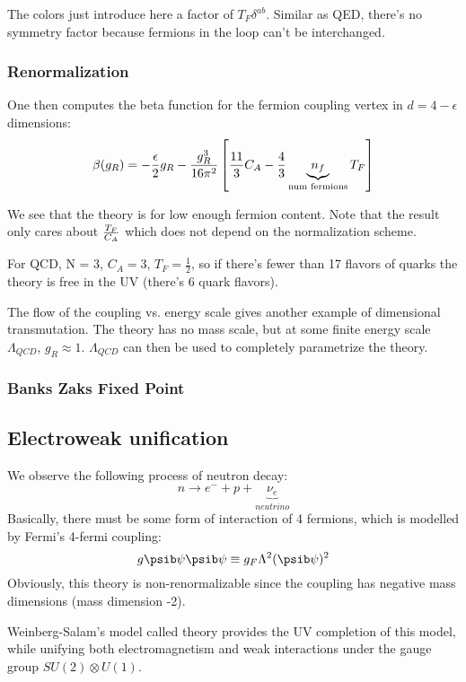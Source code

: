 \documentclass[11pt]{scrartcl}
\begin{document}
The colors just introduce here a factor of $T_F \delta^{ab}$.  Similar as QED, there's no symmetry factor because fermions in the loop can't be interchanged.

\subsubsection{Renormalization}

One then computes the beta function for the fermion coupling vertex in $d = 4 - \epsilon$ dimensions:
\[\beta(g_R) = - {\epsilon \over 2} g_R - {g_R^3 \over 16 \pi^2} \left[ {11 \over 3} C_A - {4 \over 3} \underbrace{n_f}_{ \text{num fermions}} T_F \right] \]

We see that the theory is  for low enough fermion content.  Note that the result only cares about ${T_F \over C_A}$ which does not depend on the normalization scheme.

For QCD, N = 3, $C_A = 3$, $T_F = \frac12$, so if there's fewer than 17 flavors of quarks the theory is free in the UV (there's 6 quark flavors).

The flow of the coupling vs. energy scale gives another example of dimensional transmutation.  The theory has no mass scale, but at some finite energy scale $\Lambda_{QCD}$, $g_R \approx 1$.  $\Lambda_{QCD}$ can then be used to completely parametrize the theory.

\subsubsection{Banks Zaks Fixed Point}

\subsection{Electroweak unification}
We observe the following process of neutron decay:
\[n \rightarrow e^- + p + \underbrace{\nu_e}_{neutrino} \]
Basically, there must be some form of interaction of 4 fermions, which is modelled by Fermi's 4-fermi coupling:
\[g \psib \psi \psib \psi \equiv g_F {\Lambda^2} (\psib \psi)^2 \]
Obviously, this theory is non-renormalizable since the coupling has negative mass dimensions (mass dimension -2).

Weinberg-Salam's model called  theory provides the UV completion of this model, while unifying both electromagnetism and weak interactions under the gauge group $SU(2) \otimes U(1)$. 
\end{document}

